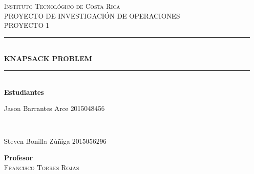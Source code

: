 \documentclass[10pt,letterpaper]{article}
\begin{document}
 
    \begin{titlepage} 
    \newcommand{\HRule}{\rule{\linewidth}{0.5mm}} 
    \center   
    \textsc{\Huge Instituto Tecnológico de Costa Rica}\\[1.5cm] 
    \textsc{\normalsize PROYECTO DE INVESTIGACIÓN DE OPERACIONES}\\[0.5cm] 
    \textsc{\normalsize PROYECTO 1}\\[0.5cm] 
    \HRule\\[0.4cm] 
    {\huge\bfseries \vspace{1cm} KNAPSACK PROBLEM}\\[0.4cm] 
    \HRule\\[2cm] 
    \textbf{\Large Estudiantes}\\[0.5cm] 
        \begin{minipage}{0.4\textwidth} 
        \begin{flushleft} 
            \large 
            Jason Barrantes Arce 
            \textsc{2015048456} 
        \end{flushleft} 
    \end{minipage} 
    ~ 
    \begin{minipage}{0.4\textwidth} 
        \begin{flushright} 
           	\large 
            Steven Bonilla Zúñiga 
            \textsc{2015056296} 
        \end{flushright} 
    \end{minipage} 
   \newline \newline 
   \newline  
   \textbf{\Large Profesor}\\[0.5cm] 
    \textsc{\normalsize Francisco Torres Rojas}\\[0.5cm] 
    \end{titlepage} 
    
\end{document}
